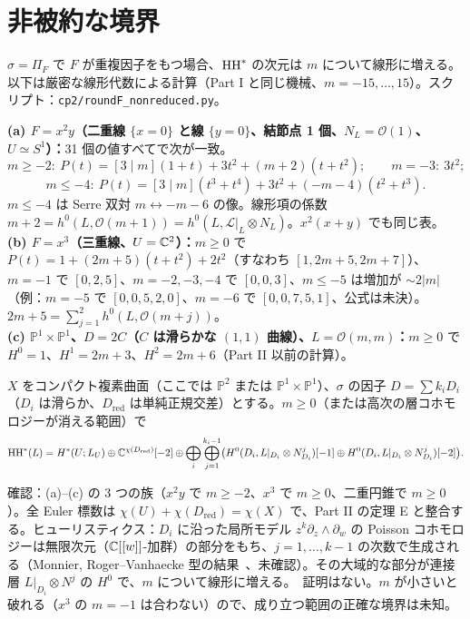 \section{非被約な境界}\label{p3:sec:nonred}
$\sigma=\Pi_F$ で $F$ が重複因子をもつ場合、$\mathrm{HH}^*$ の次元は $m$ について線形に増える。以下は厳密な線形代数による計算（Part I と同じ機械、$m=-15,\dots,15$）。スクリプト：\texttt{cp2/roundF\_nonreduced.py}。
\begin{obs}\tV\label{p3:obs:nr}
\textbf{(a) $F=x^2y$（二重線 $\{x=0\}$ と線 $\{y=0\}$、結節点 1 個、$N_L=\mathcal O(1)$、$U\simeq S^1$）：}31 個の値すべてで次が一致。
\[m\ge-2:\ P(t)=[3\mid m](1+t)+3t^2+(m+2)(t+t^2);\qquad m=-3:\ 3t^2;\]
\[m\le-4:\ P(t)=[3\mid m](t^3+t^4)+3t^2+(-m-4)(t^2+t^3).\]
$m\le-4$ は Serre 双対 $m\leftrightarrow-m-6$ の像。線形項の係数 $m+2=h^0(L,\mathcal O(m+1))=h^0(L,\mathcal L|_L\otimes N_L)$。$x^2(x+y)$ でも同じ表。\\
\textbf{(b) $F=x^3$（三重線、$U=\mathbb C^2$）：}$m\ge0$ で $P(t)=1+(2m+5)(t+t^2)+2t^2$（すなわち $[1,2m+5,2m+7]$）、$m=-1$ で $[0,2,5]$、$m=-2,-3,-4$ で $[0,0,3]$、$m\le-5$ は増加が $\sim2|m|$（例：$m=-5$ で $[0,0,5,2,0]$、$m=-6$ で $[0,0,7,5,1]$、公式は未決）。$2m+5=\sum_{j=1}^2h^0(L,\mathcal O(m+j))$。\\
\textbf{(c) $\mathbb P^1\times\mathbb P^1$、$D=2C$（$C$ は滑らかな $(1,1)$ 曲線）、$L=\mathcal O(m,m)$：}$m\ge0$ で $H^0=1$、$H^1=2m+3$、$H^2=2m+6$（Part II 以前の計算）。
\end{obs}
\begin{conj}[非被約な境界]\tK\label{p3:conj:NR}
$X$ をコンパクト複素曲面（ここでは $\mathbb P^2$ または $\mathbb P^1\times\mathbb P^1$）、$\sigma$ の因子 $D=\sum k_iD_i$（$D_i$ は滑らか、$D_{\mathrm{red}}$ は単純正規交差）とする。$m\ge0$（または高次の層コホモロジーが消える範囲）で
\[\mathrm{HH}^*(L)=H^*(U;L_U)\oplus\mathbb C^{\chi(D_{\mathrm{red}})}[-2]\oplus\bigoplus_i\bigoplus_{j=1}^{k_i-1}\bigl(H^0(D_i,L|_{D_i}\otimes N_{D_i}^{j})[-1]\oplus H^0(D_i,L|_{D_i}\otimes N_{D_i}^{j})[-2]\bigr).\]
\end{conj}
\noindent 確認：(a)--(c) の 3 つの族（$x^2y$ で $m\ge-2$、$x^3$ で $m\ge0$、二重円錐で $m\ge0$）。全 Euler 標数は $\chi(U)+\chi(D_{\mathrm{red}})=\chi(X)$ で、Part II の定理 E と整合する。ヒューリスティクス：$D_i$ に沿った局所モデル $z^k\partial_z\wedge\partial_w$ の Poisson コホモロジーは無限次元（$\mathbb C[[w]]$-加群）の部分をもち、$j=1,\dots,k-1$ の次数で生成される（Monnier, Roger--Vanhaecke 型の結果\tC\ \tQ、未確認）。その大域的な部分が連接層 $L|_{D_i}\otimes N^j$ の $H^0$ で、$m$ について線形に増える。\tK\ 証明はない。$m$ が小さいと破れる（$x^3$ の $m=-1$ は合わない）ので、成り立つ範囲の正確な境界は未知。

